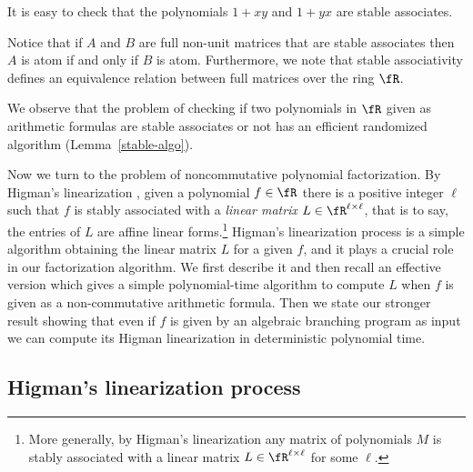 It is easy to check that the polynomials $1+xy$ and $1+yx$ are stable
associates.

Notice that if $A$ and $B$ are full non-unit matrices that are stable
associates then $A$ is atom if and only if $B$ is atom.  Furthermore,
we note that stable associativity defines an equivalence relation
between full matrices over the ring $\fR$.

We observe that the problem of checking if two polynomials in $\fR$ given as arithmetic formulas 
are stable associates or not has an efficient randomized algorithm
(Lemma~\ref{stable-algo}). 

%
%

%
%
%
%
%
%
%

%
%
%

Now we turn to the problem of noncommutative polynomial factorization.
By Higman's linearization \cite{Hig,Cohnfir}, given a polynomial
$f \in \fR$ there is a positive integer $\ell$ such that $f$ is stably
associated with a \emph{linear matrix} $L \in \fR^{\ell \times \ell}$,
that is to say, the entries of $L$ are affine linear
forms.\footnote{More generally, by Higman's linearization any matrix
  of polynomials $M$ is stably associated with a linear matrix
  $L \in \fR^{\ell \times \ell}$ for some $\ell$.}  Higman's
linearization process is a simple algorithm obtaining the linear
matrix $L$ for a given $f$, and it plays a crucial role in our
factorization algorithm. We first describe it and then recall an
effective version \cite{GGOW20} which gives a simple polynomial-time
algorithm to compute $L$ when $f$ is given as a non-commutative
arithmetic formula. Then we state our stronger result showing that
even if $f$ is given by an algebraic branching program as input
we can compute its Higman linearization in deterministic polynomial
time.

\subsection*{Higman's linearization process}

%
%

